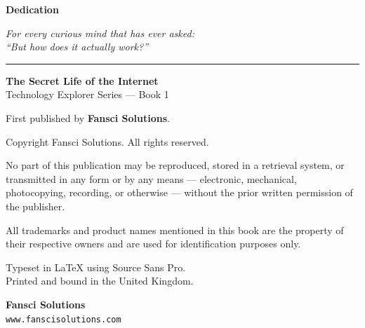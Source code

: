 
\thispagestyle{empty}
\vspace*{\fill}
\begin{center}
  {\Large\bfseries\color{InternetBlue}Dedication\par}
  \vspace{0.8cm}
  {\large\itshape For every curious mind that has ever asked:\\
  ``But how does it actually work?''\par}
\end{center}
\vspace*{2cm}
\noindent\rule{\linewidth}{0.4pt}
\vspace{0.4cm}

{\small
\noindent\textbf{The Secret Life of the Internet}\\
Technology Explorer Series --- Book 1

\vspace{0.4cm}
\noindent First published \the\year{} by \textbf{Fansci Solutions}.

\vspace{0.4cm}
\noindent Copyright \textcopyright{} \the\year{} Fansci Solutions. All rights reserved.

\vspace{0.4cm}
\noindent No part of this publication may be reproduced, stored in a retrieval system, or
transmitted in any form or by any means --- electronic, mechanical, photocopying,
recording, or otherwise --- without the prior written permission of the publisher.

\vspace{0.4cm}
\noindent All trademarks and product names mentioned in this book are the property of
their respective owners and are used for identification purposes only.

\vspace{0.4cm}
\noindent Typeset in \LaTeX{} using Source Sans Pro.\\
Printed and bound in the United Kingdom.

\vspace{0.4cm}
\noindent \textbf{Fansci Solutions}\\
\texttt{www.fanscisolutions.com}
}
\vspace*{\fill}
\clearpage
